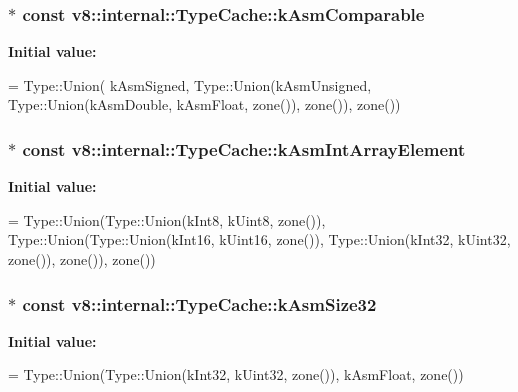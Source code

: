 \subsubsection[{\texorpdfstring{k\+Asm\+Comparable}{kAsmComparable}}]{$\ast$ const v8\+::internal\+::\+Type\+Cache\+::k\+Asm\+Comparable}\hypertarget{classv8_1_1internal_1_1_type_cache_aec3d1e0236f351201cb80c4314ae0afd}{}\label{classv8_1_1internal_1_1_type_cache_aec3d1e0236f351201cb80c4314ae0afd}
{\bfseries Initial value\+:}
\begin{DoxyCode}
= Type::Union(
      kAsmSigned,
      Type::Union(kAsmUnsigned, Type::Union(kAsmDouble, kAsmFloat, zone()),
                  zone()),
      zone())
\end{DoxyCode}
\subsubsection[{\texorpdfstring{k\+Asm\+Int\+Array\+Element}{kAsmIntArrayElement}}]{$\ast$ const v8\+::internal\+::\+Type\+Cache\+::k\+Asm\+Int\+Array\+Element}\hypertarget{classv8_1_1internal_1_1_type_cache_a5c9e8bbd2243ad859141c92284933540}{}\label{classv8_1_1internal_1_1_type_cache_a5c9e8bbd2243ad859141c92284933540}
{\bfseries Initial value\+:}
\begin{DoxyCode}
=
      Type::Union(Type::Union(kInt8, kUint8, zone()),
                  Type::Union(Type::Union(kInt16, kUint16, zone()),
                              Type::Union(kInt32, kUint32, zone()), zone()),
                  zone())
\end{DoxyCode}
\subsubsection[{\texorpdfstring{k\+Asm\+Size32}{kAsmSize32}}]{$\ast$ const v8\+::internal\+::\+Type\+Cache\+::k\+Asm\+Size32}\hypertarget{classv8_1_1internal_1_1_type_cache_a6bada6511b1cd01fac68d89692dbb4c6}{}\label{classv8_1_1internal_1_1_type_cache_a6bada6511b1cd01fac68d89692dbb4c6}
{\bfseries Initial value\+:}
\begin{DoxyCode}
=
      Type::Union(Type::Union(kInt32, kUint32, zone()), kAsmFloat, zone())
\end{DoxyCode}
